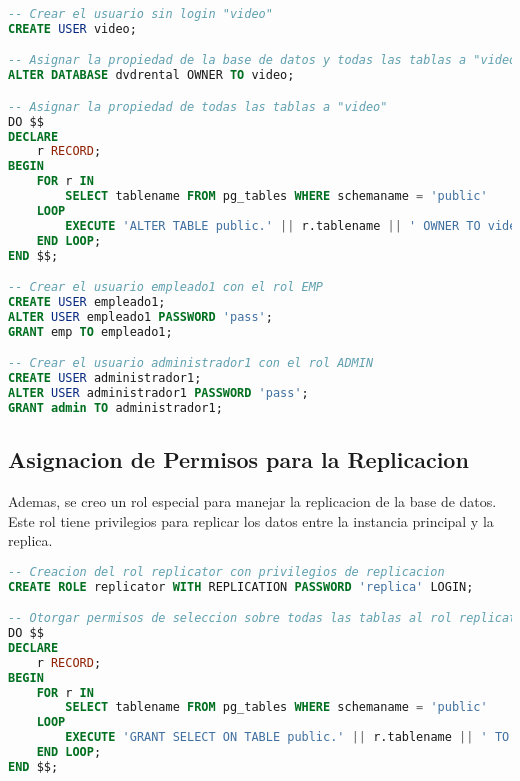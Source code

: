 \documentclass{article}
\begin{document}
\begin{lstlisting}[language=SQL]
-- Crear el usuario sin login "video"
CREATE USER video;

-- Asignar la propiedad de la base de datos y todas las tablas a "video"
ALTER DATABASE dvdrental OWNER TO video;

-- Asignar la propiedad de todas las tablas a "video"
DO $$ 
DECLARE
    r RECORD;
BEGIN
    FOR r IN 
        SELECT tablename FROM pg_tables WHERE schemaname = 'public' 
    LOOP
        EXECUTE 'ALTER TABLE public.' || r.tablename || ' OWNER TO video;';
    END LOOP;
END $$;

-- Crear el usuario empleado1 con el rol EMP
CREATE USER empleado1;
ALTER USER empleado1 PASSWORD 'pass';
GRANT emp TO empleado1;

-- Crear el usuario administrador1 con el rol ADMIN
CREATE USER administrador1;
ALTER USER administrador1 PASSWORD 'pass';
GRANT admin TO administrador1;
\end{lstlisting}

\subsection{Asignacion de Permisos para la Replicacion}

Ademas, se creo un rol especial para manejar la replicacion de la base de datos. Este rol tiene privilegios para replicar los datos entre la instancia principal y la replica.

\begin{lstlisting}[language=SQL]
-- Creacion del rol replicator con privilegios de replicacion
CREATE ROLE replicator WITH REPLICATION PASSWORD 'replica' LOGIN;

-- Otorgar permisos de seleccion sobre todas las tablas al rol replicator
DO $$ 
DECLARE
    r RECORD;
BEGIN
    FOR r IN 
        SELECT tablename FROM pg_tables WHERE schemaname = 'public' 
    LOOP
        EXECUTE 'GRANT SELECT ON TABLE public.' || r.tablename || ' TO replicator;';
    END LOOP;
END $$;
\end{lstlisting}
\end{document}
